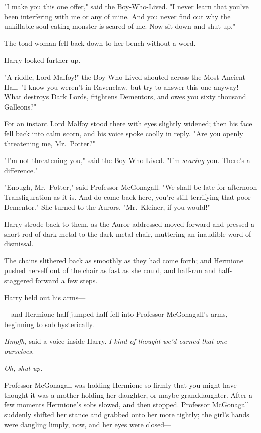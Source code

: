"I make you this one offer," said the Boy-Who-Lived. "I never learn that you've 
been interfering with me or any of mine. And you never find out why the 
unkillable soul-eating monster is scared of me. Now sit down and shut up."

The toad-woman fell back down to her bench without a word.

Harry looked further up.

"A riddle, Lord Malfoy!" the Boy-Who-Lived shouted across the Most Ancient 
Hall. "I know you weren't in Ravenclaw, but try to answer this one anyway! What 
destroys Dark Lords, frightens Dementors, and owes you sixty thousand Galleons?"

For an instant Lord Malfoy stood there with eyes slightly widened; then his 
face fell back into calm scorn, and his voice spoke coolly in reply. "Are you 
openly threatening me, Mr.~Potter?"

"I'm not threatening you," said the Boy-Who-Lived. "I'm \emph{scaring} you. 
There's a difference."

"Enough, Mr.~Potter," said Professor McGonagall. "We shall be late for 
afternoon Transfiguration as it is. And do come back here, you're still 
terrifying that poor Dementor." She turned to the Aurors. "Mr.~Kleiner, if you 
would!"

Harry strode back to them, as the Auror addressed moved forward and pressed a 
short rod of dark metal to the dark metal chair, muttering an inaudible word of 
dismissal.

The chains slithered back as smoothly as they had come forth; and Hermione 
pushed herself out of the chair as fast as she could, and half-ran and 
half-staggered forward a few steps.

Harry held out his arms---

---and Hermione half-jumped half-fell into Professor McGonagall's arms, 
beginning to sob hysterically.

\emph{Hmpfh,} said a voice inside Harry. \emph{I kind of thought we'd earned 
that one ourselves.}

\emph{Oh, shut up.}

Professor McGonagall was holding Hermione so firmly that you might have thought 
it was a mother holding her daughter, or maybe granddaughter. After a few 
moments Hermione's sobs slowed, and then stopped. Professor McGonagall suddenly 
shifted her stance and grabbed onto her more tightly; the girl's hands were 
dangling limply, now, and her eyes were closed---

